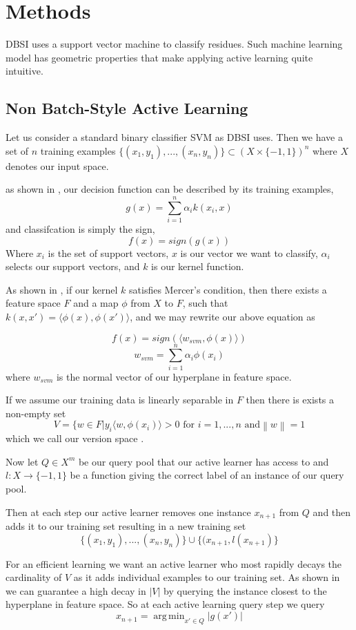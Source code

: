 \documentclass{article}
\newcommand\norm[1]{\left\lVert#1\right\rVert}
\DeclareMathOperator*{\argmin}{arg\,min}
\begin{document}
     
\section*{Methods}
DBSI uses a support vector machine to classify residues. Such machine learning model has geometric properties that make applying active learning quite intuitive. 

\subsection*{Non Batch-Style Active Learning}
Let us consider a standard binary classifier SVM as DBSI uses.
Then we have a set of $n$ training examples
$
\{(x_1,y_1),...,(x_n, y_n)\} \subset (X \times \{-1,1\})^n
$ where $X$ denotes our input space. 


 as shown in \cite{svm}, our decision function can be described by its training examples,
\[
g(x) = \sum_{i=1}^{n} \alpha_i k( x_i, x)
\]
and classifcation is simply the sign,
\[
	f(x) = sign(g(x))
\]
Where $x_i$ is the set of support vectors,
$x$ is our vector we want to classify, $\alpha_i$ selects our support vectors, and $k$ is our kernel function.

As shown in \cite{active_learning}, if our kernel $k$ satisfies Mercer's condition, then there exists a feature space $F$ and a map $\phi$ from $X$ to $F$, such that $k(x,x') = \langle \phi(x) , \phi(x') \rangle$, and we may rewrite our above equation as
 
\[
f(x) = sign(\langle w_{svm}, \phi(x) \rangle)
\]
\[
w_{svm} = \sum_{i=1}^n \alpha_i \phi(x_i)
\]
where $w_{svm}$ is the normal vector of our hyperplane in feature space. 

If we assume our training data is linearly separable in $F$ then there is exists a non-empty set
\[
V = \{w \in F | y_i \langle w, \phi(x_i) \rangle > 0 \text{ for } i = 1, ...,n \text{ and} \norm{w} = 1
\]
which we call our version space \cite{version_space}.

Now let $Q \in X^m$ be our query pool that our active learner has access to and
$l : X \rightarrow \{-1,1\}$ be a function giving the correct label of an instance of our query pool.

Then at each step our active learner removes one instance $x_{n+1}$ from $Q$ and then adds it to our training set resulting in a new training set
\[
\{(x_1, y_1),...,(x_n,y_n)\}\cup\{(x_{n+1}, l(x_{n+1})\}
\]


For an efficient learning we want an active learner who most rapidly decays the cardinality of $V$ as it adds individual examples to our training set. As shown in \cite{active_learning} we can guarantee a high decay in $|V|$ by querying the instance closest to the hyperplane in feature space. So at each active learning query step we query
\[
x_{n+1} = \argmin_{x' \in Q} |g(x')|
\]
\end{document}
